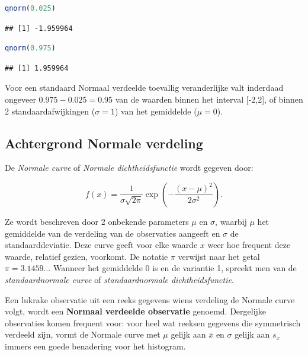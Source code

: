 \documentclass[
  12pt,dutch,coursenotes]{book}
\theoremstyle{definition}
\theoremstyle{definition}
\theoremstyle{definition}
\theoremstyle{definition}
\theoremstyle{remark}
\begin{document}
\begin{lstlisting}[language=R]
qnorm(0.025)
\end{lstlisting}

\begin{lstlisting}
## [1] -1.959964
\end{lstlisting}

\begin{lstlisting}[language=R]
qnorm(0.975)
\end{lstlisting}

\begin{lstlisting}
## [1] 1.959964
\end{lstlisting}

Voor een standaard Normaal verdeelde toevallig veranderlijke valt inderdaad ongeveer \(0.975 - 0.025=0.95\) van de waarden binnen het interval {[}-2,2{]}, of binnen 2 standaardafwijkingen (\(\sigma=1\)) van het gemiddelde (\(\mu=0\)).

\hypertarget{subsec:normalcalc}{%
\subsection{Achtergrond Normale verdeling}\label{subsec:normalcalc}}

De \emph{Normale curve} of \emph{Normale dichtheidsfunctie} wordt gegeven door:

\begin{equation*}
f(x) = \frac{1}{\sigma \sqrt{2 \pi} } \exp \left ( - \frac{ (x - \mu)^2 }{ 2
\sigma^2} \right ).
\end{equation*}

Ze wordt beschreven door 2 onbekende parameters \(\mu\) en \(\sigma\), waarbij \(\mu\) het gemiddelde van de verdeling van de observaties aangeeft en \(\sigma\)
de standaarddeviatie. Deze curve geeft voor elke waarde \(x\) weer hoe
frequent deze waarde, relatief gezien, voorkomt. De notatie \(\pi\) verwijst
naar het getal \(\pi=3.1459...\) Wanneer het gemiddelde 0 is en de variantie
1, spreekt men van de \emph{standaardnormale curve} of \emph{standaardnormale dichtheidsfunctie}.

Een lukrake observatie uit een reeks gegevens wiens verdeling de Normale
curve volgt, wordt een \textbf{Normaal verdeelde observatie} genoemd.
Dergelijke observaties komen frequent voor: voor heel wat reeksen gegevens
die symmetrisch verdeeld zijn, vormt de Normale curve met \(\mu\) gelijk aan \(\bar x\) en \(\sigma\) gelijk aan \(s_x\) immers een goede benadering voor het
histogram.
\end{document}
